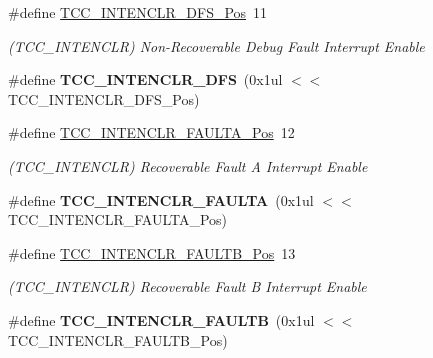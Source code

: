 \begin{DoxyCompactItemize}
\item 
\hypertarget{group___s_a_m_l21___t_c_c_ga2a9d5dd11162a593bff3bd30330ced1e}{}\#define \hyperlink{group___s_a_m_l21___t_c_c_ga2a9d5dd11162a593bff3bd30330ced1e}{T\+C\+C\+\_\+\+I\+N\+T\+E\+N\+C\+L\+R\+\_\+\+D\+F\+S\+\_\+\+Pos}~11\label{group___s_a_m_l21___t_c_c_ga2a9d5dd11162a593bff3bd30330ced1e}

\begin{DoxyCompactList}\small\item\em (T\+C\+C\+\_\+\+I\+N\+T\+E\+N\+C\+L\+R) Non-\/\+Recoverable Debug Fault Interrupt Enable \end{DoxyCompactList}\item 
\hypertarget{group___s_a_m_l21___t_c_c_gaf3bd404a6c4e70e71cb09ff5da7dc6bd}{}\#define {\bfseries T\+C\+C\+\_\+\+I\+N\+T\+E\+N\+C\+L\+R\+\_\+\+D\+F\+S}~(0x1ul $<$$<$ T\+C\+C\+\_\+\+I\+N\+T\+E\+N\+C\+L\+R\+\_\+\+D\+F\+S\+\_\+\+Pos)\label{group___s_a_m_l21___t_c_c_gaf3bd404a6c4e70e71cb09ff5da7dc6bd}

\item 
\hypertarget{group___s_a_m_l21___t_c_c_ga923604735a9f378ab41f75dd7aa6acc8}{}\#define \hyperlink{group___s_a_m_l21___t_c_c_ga923604735a9f378ab41f75dd7aa6acc8}{T\+C\+C\+\_\+\+I\+N\+T\+E\+N\+C\+L\+R\+\_\+\+F\+A\+U\+L\+T\+A\+\_\+\+Pos}~12\label{group___s_a_m_l21___t_c_c_ga923604735a9f378ab41f75dd7aa6acc8}

\begin{DoxyCompactList}\small\item\em (T\+C\+C\+\_\+\+I\+N\+T\+E\+N\+C\+L\+R) Recoverable Fault A Interrupt Enable \end{DoxyCompactList}\item 
\hypertarget{group___s_a_m_l21___t_c_c_ga9bc9eff5039c533701b0ba81f41ee86a}{}\#define {\bfseries T\+C\+C\+\_\+\+I\+N\+T\+E\+N\+C\+L\+R\+\_\+\+F\+A\+U\+L\+T\+A}~(0x1ul $<$$<$ T\+C\+C\+\_\+\+I\+N\+T\+E\+N\+C\+L\+R\+\_\+\+F\+A\+U\+L\+T\+A\+\_\+\+Pos)\label{group___s_a_m_l21___t_c_c_ga9bc9eff5039c533701b0ba81f41ee86a}

\item 
\hypertarget{group___s_a_m_l21___t_c_c_ga6a052f2fc715427b067612b7726293ba}{}\#define \hyperlink{group___s_a_m_l21___t_c_c_ga6a052f2fc715427b067612b7726293ba}{T\+C\+C\+\_\+\+I\+N\+T\+E\+N\+C\+L\+R\+\_\+\+F\+A\+U\+L\+T\+B\+\_\+\+Pos}~13\label{group___s_a_m_l21___t_c_c_ga6a052f2fc715427b067612b7726293ba}

\begin{DoxyCompactList}\small\item\em (T\+C\+C\+\_\+\+I\+N\+T\+E\+N\+C\+L\+R) Recoverable Fault B Interrupt Enable \end{DoxyCompactList}\item 
\hypertarget{group___s_a_m_l21___t_c_c_ga330700386d55d196f9ab09ea40e46fce}{}\#define {\bfseries T\+C\+C\+\_\+\+I\+N\+T\+E\+N\+C\+L\+R\+\_\+\+F\+A\+U\+L\+T\+B}~(0x1ul $<$$<$ T\+C\+C\+\_\+\+I\+N\+T\+E\+N\+C\+L\+R\+\_\+\+F\+A\+U\+L\+T\+B\+\_\+\+Pos)\label{group___s_a_m_l21___t_c_c_ga330700386d55d196f9ab09ea40e46fce}


\end{DoxyCompactItemize}
